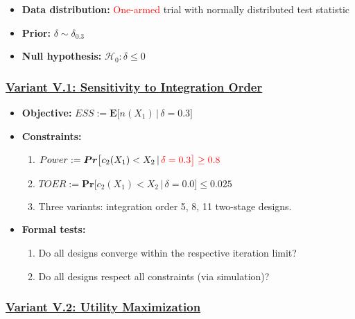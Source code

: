 \documentclass[]{book}
\providecommand{\tightlist}{%
  \setlength{\itemsep}{0pt}\setlength{\parskip}{0pt}}
\begin{document}
\begin{itemize}
\tightlist
\item
  \textbf{Data distribution:} \textcolor{red}{One-armed} trial with normally distributed test statistic
\item
  \textbf{Prior:} \(\delta\sim\delta_{0.3}\)
\item
  \textbf{Null hypothesis:} \(\mathcal{H}_0:\delta \leq 0\)
\end{itemize}

\hypertarget{variant-v.1-sensitivity-to-integration-order}{%
\subsubsection{\texorpdfstring{\protect\hyperlink{variantV_1}{Variant V.1: Sensitivity to Integration Order}}{Variant V.1: Sensitivity to Integration Order}}\label{variant-v.1-sensitivity-to-integration-order}}

\begin{itemize}
\tightlist
\item
  \textbf{Objective:} \(ESS := \boldsymbol{E}\big[n(X_1)\,|\,\delta=0.3\big]\)
\item
  \textbf{Constraints:}

  \begin{enumerate}
  \def\labelenumi{\arabic{enumi}.}
  \tightlist
  \item
    \(Power := \boldsymbol{Pr}\big[c_2(X_1) < X_2\,|\,\color{red}{\delta=0.3}\big] \geq 0.8\)
  \item
    \(TOER := \boldsymbol{Pr}\big[c_2(X_1) < X_2\,|\,\delta=0.0\big] \leq 0.025\)
  \item
    Three variants: integration order 5, 8, 11 two-stage designs.
  \end{enumerate}
\item
  \textbf{Formal tests:}

  \begin{enumerate}
  \def\labelenumi{\arabic{enumi}.}
  \tightlist
  \item
    Do all designs converge within the respective iteration limit?
  \item
    Do all designs respect all constraints (via simulation)?
  \end{enumerate}
\end{itemize}

\hypertarget{variant-v.2-utility-maximization}{%
\subsubsection{\texorpdfstring{\protect\hyperlink{variantV_2}{Variant V.2: Utility Maximization}}{Variant V.2: Utility Maximization}}\label{variant-v.2-utility-maximization}}
\end{document}
